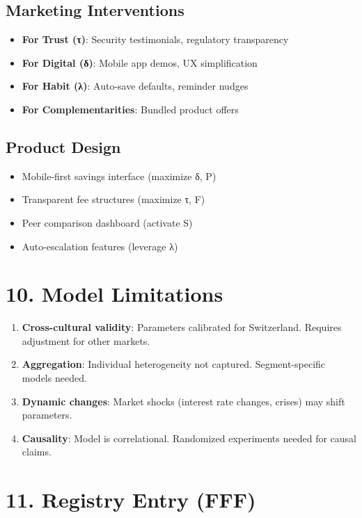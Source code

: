 \documentclass[11pt,a4paper]{article}
\begin{document}
\subsection{Marketing Interventions}
\begin{itemize}
\item \textbf{For Trust (τ)}: Security testimonials, regulatory transparency
\item \textbf{For Digital (δ)}: Mobile app demos, UX simplification
\item \textbf{For Habit (λ)}: Auto-save defaults, reminder nudges
\item \textbf{For Complementarities}: Bundled product offers
\end{itemize}

\subsection{Product Design}
\begin{itemize}
\item Mobile-first savings interface (maximize δ, P)
\item Transparent fee structures (maximize τ, F)
\item Peer comparison dashboard (activate S)
\item Auto-escalation features (leverage λ)
\end{itemize}

\section{10. Model Limitations}

\begin{enumerate}
\item \textbf{Cross-cultural validity}: Parameters calibrated for Switzerland. Requires adjustment for other markets.
\item \textbf{Aggregation}: Individual heterogeneity not captured. Segment-specific models needed.
\item \textbf{Dynamic changes}: Market shocks (interest rate changes, crises) may shift parameters.
\item \textbf{Causality}: Model is correlational. Randomized experiments needed for causal claims.
\end{enumerate}

\section{11. Registry Entry (FFF)}
\end{document}
